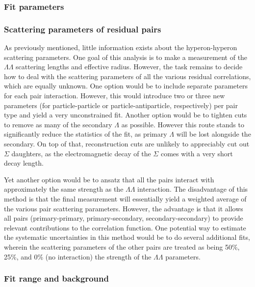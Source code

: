 \subsubsection{Fit parameters}
% 


\subsubsection{Scattering parameters of residual pairs}
\label{sec:ScatteringParams}


As previously mentioned, little information exists about the hyperon-hyperon scattering parameters.  
One goal of this analysis is to make a measurement of the $\Lambda\Lambda$ scattering lengths and effective radius.  
However, the task remains to decide how to deal with the scattering parameters of all the various residual correlations, which are equally unknown.  
One option would be to include separate parameters for each pair interaction.  
However, this would introduce two or three new parameters (for particle-particle or particle-antiparticle, respectively) per pair type and yield a very unconstrained fit.  
Another option would be to tighten cuts to remove as many of the secondary $\Lambda$ as possible.  However this route stands to significantly reduce the statistics of the fit, as primary $\Lambda$ will be lost alongside the secondary.  
On top of that, reconstruction cuts are unlikely to appreciably cut out $\Sigma$ daughters, as the electromagnetic decay of the $\Sigma$ comes with a very short decay length.

Yet another option would be to ansatz that all the pairs interact with approximately the same strength as the $\Lambda\Lambda$ interaction.  
The disadvantage of this method is that the final measurement will essentially yield a weighted average of the various pair scattering parameters.  
However, the advantage is that it allows all pairs (primary-primary, primary-secondary, secondary-secondary) to provide relevant contributions to the correlation function.  
One potential way to estimate the systematic uncertainties in this method would be to do several additional fits, wherein the scattering parameters of the other pairs are treated as being 50\%, 25\%, and 0\% (no interaction) the strength of the $\Lambda\Lambda$ parameters.

\subsubsection{Fit range and background}
\label{sec:FitBackground}



